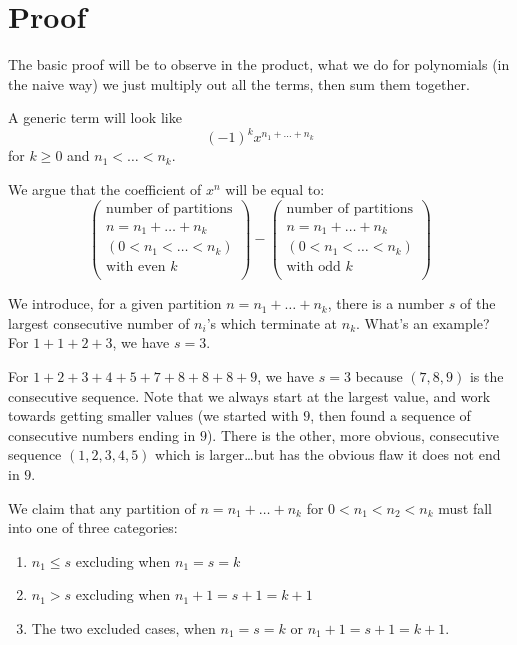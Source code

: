 \documentclass{article}
\begin{document}
\section{Proof}

The basic proof will be to observe in the product, what we do for polynomials (in the naive way) we just multiply out all the terms, then sum them together. 

 A generic term will look like
\begin{equation}
(-1)^{k}x^{n_{1}+\dots+n_{k}}
\end{equation}
for $k\geq0$ and $n_{1}<\dots<n_{k}$.

 We argue that the coefficient of $x^{n}$ will be equal to:
\begin{equation}
\begin{pmatrix}
\mbox{number of partitions}\\
n = n_{1} + \dots + n_{k}\\
(0<n_{1}<\dots<n_{k})\\
\mbox{with even }k\\
\end{pmatrix}
-
\begin{pmatrix}
\mbox{number of partitions}\\
n = n_{1} + \dots + n_{k}\\
(0<n_{1}<\dots<n_{k})\\
\mbox{with odd }k\\
\end{pmatrix}
\end{equation}

 We introduce, for a given partition $n=n_{1}+\dots+n_{k}$,
there is a number $s$ of the largest consecutive number of $n_{i}$'s
which terminate at $n_{k}$. What's an example? For $1+1+2+3$, we have
$s=3$.

For $1+2+3+4+5+7+8+8+8+9$, we have $s=3$ because $(7,8,9)$ is the
consecutive sequence. Note that we always start at the largest value,
and work towards getting smaller values (we started with $9$, then found a
sequence of consecutive numbers ending in $9$). There is the other, more
obvious, consecutive sequence $(1,2,3,4,5)$ which is larger\dots but has
the obvious flaw it does not end in $9$.

 We claim that any partition of $n=n_{1}+\dots+n_{k}$ for
$0<n_{1}<n_{2}<n_{k}$ must fall into one of three categories: 
\begin{enumerate}
\item $n_{1}\leq s$ excluding when $n_{1}=s=k$
\item $n_{1}>s$ excluding when $n_{1}+1=s+1=k+1$
\item The two excluded cases, when $n_{1}=s=k$ or $n_{1}+1=s+1=k+1$.
\end{enumerate}
\end{document}
